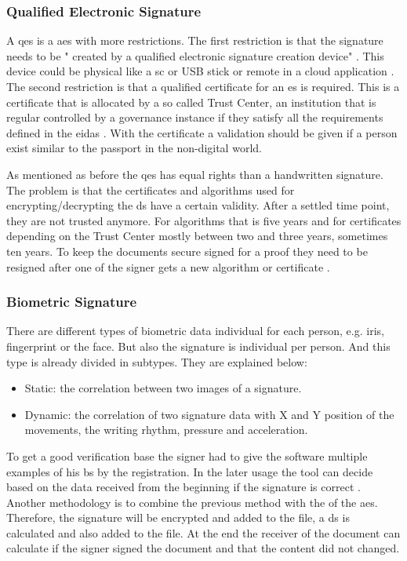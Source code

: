 \subsubsection{Qualified Electronic Signature}
A \gls{qes} is a \gls{aes} with more restrictions. The first restriction is that the signature needs to be " created   by   a   qualified   electronic   
signature  creation  device" \parencite[Article 3]{eIDAS2014}. This device could be physical like a \gls{sc} or USB stick or remote in a cloud application \parencite{CEFd2018}. The second restriction is that a qualified  certificate  for an \gls{es} is required. This is a certificate that is allocated by a so called Trust Center, an institution that is regular controlled by a governance instance if they satisfy all the requirements defined in the \gls{eidas} \parencite{CEFd2018}. With the certificate a validation should be given if a person exist similar to the passport in the non-digital world.

As mentioned as before the \gls{qes} has equal rights than a handwritten signature. The problem is that the certificates and algorithms used for encrypting/decrypting the \gls{ds} have a certain validity. After a settled time point, they are not trusted anymore. For algorithms that is five years and for certificates depending on the Trust Center mostly between two and three years, sometimes ten years. To keep the documents secure signed for a proof they need to be resigned after one of the signer gets a new algorithm or certificate \parencite{Steffens2018Gueltigkeit}.

\subsubsection{Biometric Signature}
There are different types of biometric data individual for each person, e.g. iris, fingerprint or the face. But also the signature is individual per person. And this type is already divided in subtypes. They are explained below:
\begin{itemize}
	\item Static: the correlation between two images of a signature.
	\item Dynamic: the correlation of two signature data with X and Y position of the movements, the writing rhythm, pressure and acceleration.
\end{itemize}
\parencite{biometric2017types,bayometric2018}

To get a good verification base the signer had to give the software multiple examples of his \gls{bs} by the registration. In the later usage the tool can decide based on the data received from the beginning if the signature is correct \parencite{bayometric2018}. Another methodology is to combine the previous method with the of the \gls{aes}. Therefore, the signature will be encrypted and added to the file, a \gls{ds} is calculated and also added to the file. At the end the receiver of the document can calculate if the signer signed the document and that the content did not changed. 

